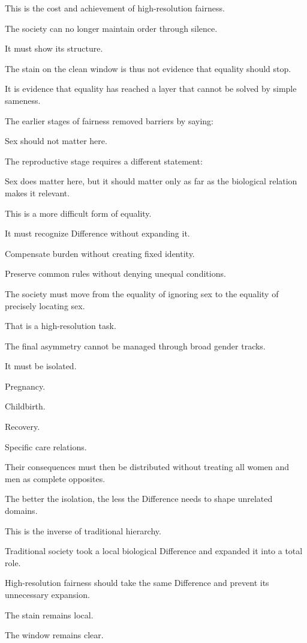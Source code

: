 This is the cost and achievement of high-resolution fairness.

The society can no longer maintain order through silence.

It must show its structure.

The stain on the clean window is thus not evidence that equality should stop.

It is evidence that equality has reached a layer that cannot be solved by simple sameness.

The earlier stages of fairness removed barriers by saying:

Sex should not matter here.

The reproductive stage requires a different statement:

Sex does matter here, but it should matter only as far as the biological relation makes it relevant.

This is a more difficult form of equality.

It must recognize Difference without expanding it.

Compensate burden without creating fixed identity.

Preserve common rules without denying unequal conditions.

The society must move from the equality of ignoring sex to the equality of precisely locating sex.

That is a high-resolution task.

The final asymmetry cannot be managed through broad gender tracks.

It must be isolated.

Pregnancy.

Childbirth.

Recovery.

Specific care relations.

Their consequences must then be distributed without treating all women and men as complete opposites.

The better the isolation, the less the Difference needs to shape unrelated domains.

This is the inverse of traditional hierarchy.

Traditional society took a local biological Difference and expanded it into a total role.

High-resolution fairness should take the same Difference and prevent its unnecessary expansion.

The stain remains local.

The window remains clear.


